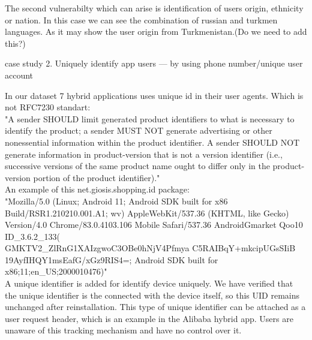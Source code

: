 The second vulnerabilty which can arise is identification of users origin, ethnicity or nation. In this case we can see the combination of russian and turkmen languages. As it may show the user origin from Turkmenistan.(Do we need to add this?) 


case study 2.  Uniquely identify app users — by using phone number/unique user account 

In our dataset 7 hybrid applications uses unique id in their user agents. Which is not  RFC7230 standart:\\

"A sender SHOULD limit generated product identifiers to what is
   necessary to identify the product; a sender MUST NOT generate
   advertising or other nonessential information within the product
   identifier.  A sender SHOULD NOT generate information in
   product-version that is not a version identifier (i.e., successive versions of the same product name ought to differ only in the product-version portion of the product identifier)." \\
   
   
An example of this net.giosis.shopping.id package:
\\

               "Mozilla/5.0 (Linux; Android 11; Android SDK built for x86                        Build/RSR1.210210.001.A1; wv) AppleWebKit/537.36 (KHTML, like Gecko) Version/4.0 Chrome/83.0.4103.106 Mobile Safari/537.36 AndroidGmarket Qoo10 ID\_3.6.2\_133(\\GMKTV2\_ZlRnG1XAIzgwoC3OBe0hNjV4Pfmya
 C5RAIBqY+mkcipUGsSIiB\\19AyfIHQY1msEafG/xGz9RIS4=;
 Android SDK built for x86;11;en\_US;2000010476)"
 \\
 
A unique identifier is added for identify device uniquely. We have verified that the unique identifier is the connected with the device itself, so this UID remains unchanged after reinstallation.
This type of unique identifier can be attached as a user request header, which is an example in the Alibaba hybrid app. Users are unaware of this tracking mechanism and have no control over it. 

